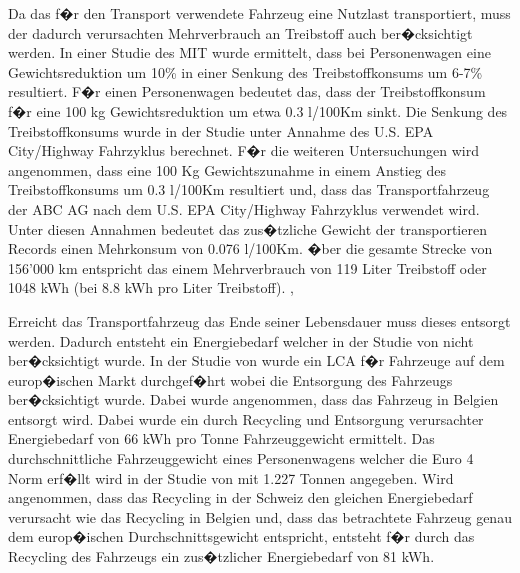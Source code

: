 \documentclass[a4paper,twoside,10pt]{report}
\begin{document}
Da das f�r den Transport verwendete Fahrzeug eine Nutzlast transportiert, muss der dadurch verursachten Mehrverbrauch an Treibstoff auch ber�cksichtigt werden. In einer Studie des MIT wurde ermittelt, dass bei Personenwagen eine Gewichtsreduktion um 10\% in einer Senkung des Treibstoffkonsums um 6-7\% resultiert. F�r einen Personenwagen bedeutet das, dass der Treibstoffkonsum f�r eine 100 kg Gewichtsreduktion um etwa 0.3 l/100Km sinkt. Die Senkung des Treibstoffkonsums wurde in der Studie unter Annahme des U.S. EPA City/Highway Fahrzyklus berechnet. F�r die weiteren Untersuchungen wird angenommen, dass eine 100 Kg Gewichtszunahme in einem Anstieg des Treibstoffkonsums um 0.3 l/100Km resultiert und, dass das Transportfahrzeug der ABC AG nach dem U.S. EPA City/Highway Fahrzyklus verwendet wird. Unter diesen Annahmen bedeutet das zus�tzliche Gewicht der transportieren Records einen Mehrkonsum von 0.076 l/100Km. �ber die gesamte Strecke von 156'000 km entspricht das einem Mehrverbrauch von 119 Liter Treibstoff oder 1048 kWh (bei 8.8 kWh pro Liter Treibstoff). \cite{mit_car}, \cite{auto_lca}

Erreicht das Transportfahrzeug das Ende seiner Lebensdauer muss dieses entsorgt werden. Dadurch entsteht ein Energiebedarf welcher in der Studie von \citeauthor{auto_lca} nicht ber�cksichtigt wurde. In der Studie von \citeauthor{auto_lca_2} wurde ein \ac{LCA} f�r Fahrzeuge auf dem europ�ischen Markt durchgef�hrt wobei die Entsorgung des Fahrzeugs ber�cksichtigt wurde. Dabei wurde angenommen, dass das Fahrzeug in Belgien entsorgt wird. Dabei wurde ein durch Recycling und Entsorgung verursachter Energiebedarf von 66 kWh pro Tonne Fahrzeuggewicht ermittelt. Das durchschnittliche Fahrzeuggewicht eines Personenwagens welcher die Euro 4 Norm erf�llt wird in der Studie von \citeauthor{auto_lca_2} mit 1.227 Tonnen angegeben. Wird angenommen, dass das Recycling in der Schweiz den gleichen Energiebedarf verursacht wie das Recycling in Belgien und, dass das betrachtete Fahrzeug genau dem europ�ischen Durchschnittsgewicht entspricht, entsteht f�r durch das Recycling des Fahrzeugs ein zus�tzlicher Energiebedarf von 81 kWh. \cite{auto_lca_2}
\end{document}
